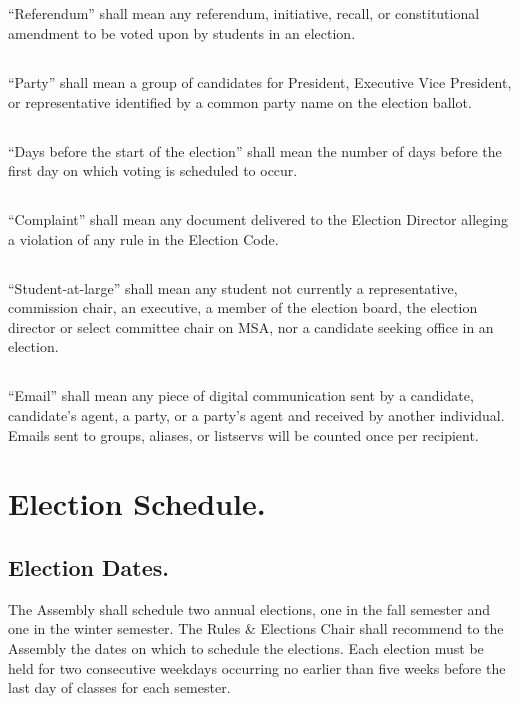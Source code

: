 \subsection{}
``Referendum'' shall mean any referendum, initiative, recall, or constitutional amendment to be voted upon by students in an election.

\subsection{}
``Party'' shall mean a group of candidates for President, Executive Vice President, or representative identified by a common party name on the election ballot.

\subsection{}
``Days before the start of the election'' shall mean the number of days before the first day on which voting is scheduled to occur.

\subsection{}
``Complaint'' shall mean any document delivered to the Election Director alleging a violation of any rule in the Election Code.

\subsection{}
``Student-at-large'' shall mean any student not currently a representative, commission chair, an executive, a member of the election board, the election director or select committee chair on MSA, nor a candidate seeking office in an election.

\subsection{}
``Email'' shall mean any piece of digital communication sent by a candidate, candidate's agent, a party, or a party's agent and received by another individual. Emails sent to groups, aliases, or listservs will be counted once per recipient.


\section{Election Schedule.}  

\subsection{Election Dates.}
The Assembly shall schedule two annual elections, one in the fall semester and one in the winter semester.  The Rules \& Elections Chair shall recommend to the Assembly the dates on which to schedule the elections.  Each election must be held for two consecutive weekdays occurring no earlier than five weeks before the last day of classes for each semester.  


